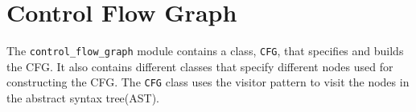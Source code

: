 \section{Control Flow Graph}
The \texttt{control\_flow\_graph} module contains a class, \texttt{CFG}, that specifies and builds the CFG.
It also contains different classes that specify different nodes used for constructing the CFG.
The \texttt{CFG} class uses the visitor pattern\cite{design_patterns} to visit the nodes in the abstract syntax tree(AST).

